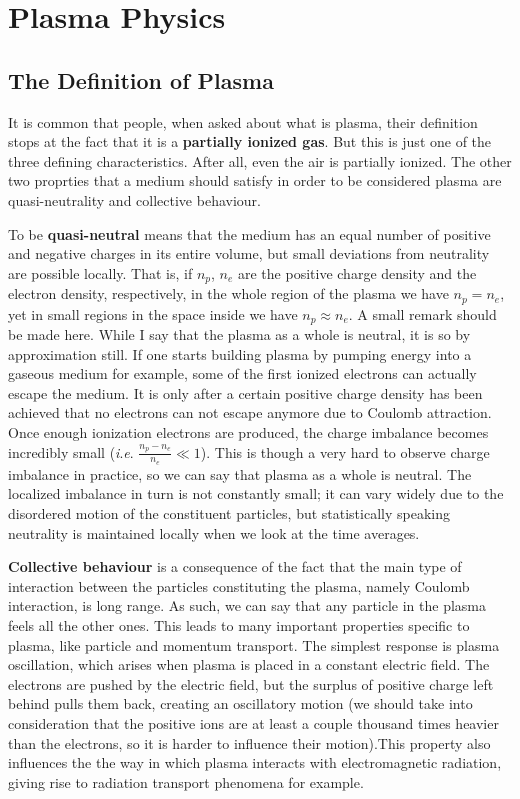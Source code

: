 \documentclass[12pt, class=report, crop=false]{standalone}
\begin{document}
\chapter{Plasma Physics}%
\label{chap:plasma}

\section{The Definition of Plasma}
It is common that people, when asked about what is plasma, their definition stops at the fact that it is a \textbf{partially ionized gas}. But this is just one of the three defining characteristics. After all, even the air is partially ionized. The other two proprties that a medium should satisfy in order to be considered plasma are quasi-neutrality and collective behaviour.

To be \textbf{quasi-neutral} means that the medium has an equal number of positive and negative charges in its entire volume, but small deviations from neutrality are possible locally. That is, if \(n_p\), \(n_e\) are the positive charge density and the electron density, respectively, in the whole region of the plasma we have \(n_p = n_e\), yet in small regions in the space inside we have \(n_p \approx n_e\). A small remark should be made here. While I say that the plasma as a whole is neutral, it is so by approximation still. If one starts building plasma by pumping energy into a gaseous medium for example, some of the first ionized electrons can actually escape the medium. It is only after a certain positive charge density has been achieved that no electrons can not escape anymore due to Coulomb attraction. Once enough ionization electrons are produced, the charge imbalance becomes incredibly small (\textit{i}.\textit{e}. \(\frac{n_p - n_e}{n_e}\ll 1\)). This is though a very hard to observe charge imbalance in practice, so we can say that plasma as a whole is neutral. The localized imbalance in turn is not constantly small; it can vary widely due to the disordered motion of the constituent particles, but statistically speaking neutrality is maintained locally when we look at the time averages.

\textbf{Collective behaviour} is a consequence of the fact that the main type of interaction between the particles constituting the plasma, namely Coulomb interaction, is long range. As such, we can say that any particle in the plasma feels all the other ones. This leads to many important properties specific to plasma, like particle and momentum transport. The simplest response is plasma oscillation, which arises when plasma is placed in a constant electric field. The electrons are pushed by the electric field, but the surplus of positive charge left behind pulls them back, creating an oscillatory motion (we should take into consideration that the positive ions are at least a couple thousand times heavier than the electrons, so it is harder to influence their motion).This property also influences the the way in which plasma interacts with electromagnetic radiation, giving rise to radiation transport phenomena for example.
\end{document}

